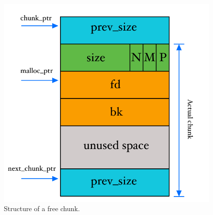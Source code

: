 \documentclass{article}
\numberwithin{equation}{subsection}
\begin{document}
\begin{figure}[H]
\begin{minipage}[b]{0.5\textwidth}
    \includegraphics[width=\textwidth]{free_chunk.pdf}
    \caption{Structure of a free chunk.}
    \label{fig:free_chunk}
  \end{minipage}
\end{figure}
\end{document}
